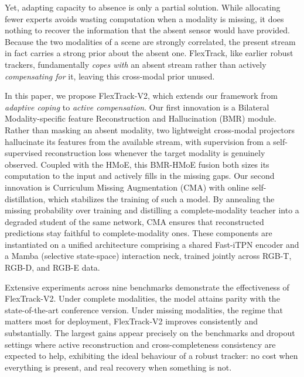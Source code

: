 Yet, adapting capacity to absence is only a partial solution. While allocating fewer experts avoids wasting computation when a modality is missing, it does nothing to recover the information that the absent sensor would have provided. Because the two modalities of a scene are strongly correlated, the present stream in fact carries a strong prior about the absent one. FlexTrack, like earlier robust trackers, fundamentally \emph{copes with} an absent stream rather than actively \emph{compensating for} it, leaving this cross-modal prior unused.

In this paper, we propose FlexTrack-V2, which extends our framework from \emph{adaptive coping} to \emph{active compensation}. Our first innovation is a Bilateral Modality-specific feature Reconstruction and Hallucination (BMR) module. Rather than masking an absent modality, two lightweight cross-modal projectors hallucinate its features from the available stream, with supervision from a self-supervised reconstruction loss whenever the target modality is genuinely observed. Coupled with the HMoE, this BMR-HMoE fusion both sizes its computation to the input and actively fills in the missing gaps. Our second innovation is Curriculum Missing Augmentation (CMA) with online self-distillation, which stabilizes the training of such a model. By annealing the missing probability over training and distilling a complete-modality teacher into a degraded student of the same network, CMA ensures that reconstructed predictions stay faithful to complete-modality ones. These components are instantiated on a unified architecture comprising a shared Fast-iTPN encoder and a Mamba (selective state-space) interaction neck, trained jointly across RGB-T, RGB-D, and RGB-E data.

Extensive experiments across nine benchmarks demonstrate the effectiveness of FlexTrack-V2. Under complete modalities, the model attains parity with the state-of-the-art conference version. Under missing modalities, the regime that matters most for deployment, FlexTrack-V2 improves consistently and substantially. The largest gains appear precisely on the benchmarks and dropout settings where active reconstruction and cross-completeness consistency are expected to help, exhibiting the ideal behaviour of a robust tracker: no cost when everything is present, and real recovery when something is not.

